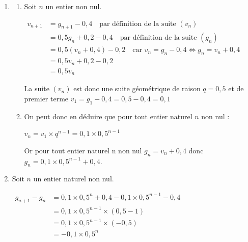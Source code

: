 \documentclass[10pt]{article}
\begin{document}
\begin{enumerate}
\begin{enumerate}
$\begin{aligned} g_{n+1}=P(G_{n+1}) &= P(G_n\cap G_{n+1}) + P(D_n \cap G_{n+1})\\
&= g_n\times 0,7 +(1-g_n)\times 0,2 \\
&= 0,7g_n+0,2- 0,2g_n\\
&= 0,5g_n+0,2\end{aligned}$

On arrive bien au résultat annoncé.

	\end{enumerate}
	\item
	\begin{enumerate}
		\item  Soit $n$ un entier non nul.

		$\begin{aligned} v_{n+1}& = g_{n+1}-0,4 \quad \text{par définition de la suite } \left(v_n\right)\\
		&= 0,5g_n+0,2-0,4 \quad \text{par définition de la suite } \left(g_n\right)\\
		&= 0,5 ( v_n+0,4) -0,2 \quad \text{car } v_n=g_n-0,4 \iff g_n=v_n+0,4\\
		&= 0,5 v_n +0,2-0,2\\
		&=0,5v_n\end{aligned}$

		La suite $ \left(v_n\right)$ est donc une suite géométrique de raison $q = 0,5$ et de premier terme \linebreak$v_1 = g_1 - 0,4 = 0,5 - 0,4 = 0,1$


		\item  On peut donc en déduire que pour tout entier naturel $n$ non nul :

		$v_n=v_1\times q^{n-1}= 0,1 \times 0,5^{n-1}$

		Or pour tout entier naturel n non nul \quad $g_n=v_n+0,4$ \quad donc \quad $g_n=0,1 \times 0,5^{n-1}+0,4$.

	\end{enumerate}
	\item   Soit $n$ un entier naturel non nul.

	$\begin{aligned} g_{n+1}-g_{n}&=0,1 \times 0,5^{n}+0,4-0,1 \times 0,5^{n-1}-0,4\\
	&= 0,1 \times 0,5^{n-1} \times ( 0,5-1)\\
	&= 0,1 \times 0,5^{n-1} \times (-0,5)\\
	&= -0,1 \times 0,5^n\end{aligned}$


\end{enumerate}
\end{document}
